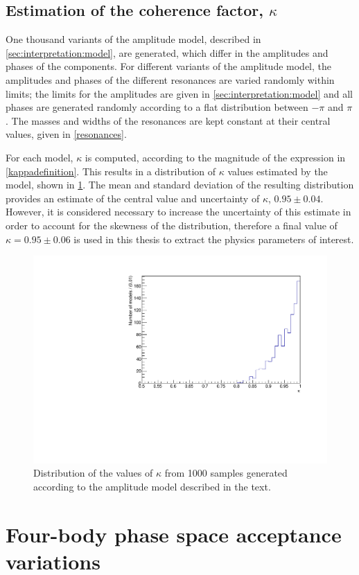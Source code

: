 \subsection{Estimation of the coherence factor, $\kappa$}
\label{sec:interpretation:kappa}

One thousand variants of the amplitude model, described in \sect\ref{sec:interpretation:model}, are generated, which differ in the amplitudes and phases of the components. For different variants of the amplitude model, the amplitudes and phases of the different resonances are varied randomly within limits; the limits for the amplitudes are given in \sect\ref{sec:interpretation:model} and all phases are generated randomly according to a flat distribution between $-\pi$ and $\pi$. The masses and widths of the resonances are kept constant at their central values, given in \tab\ref{resonances}. 

For each model, $\kappa$ is computed, according to the magnitude of the expression in \eqn\ref{kappadefinition}. This results in a distribution of $\kappa$ values estimated by the model, shown in \fig\ref{kappadistribution}. The mean and standard deviation of the resulting distribution provides an estimate of the central value and uncertainty of $\kappa$,  $0.95 \pm 0.04$. However, it is considered necessary to increase the uncertainty of this estimate in order to account for the skewness of the distribution, therefore a final value of $\kappa = 0.95 \pm 0.06$ is used in this thesis to extract the physics parameters of interest.

\begin{figure}[h]
\centering
\includegraphics[trim = 0mm 0mm 0mm 8mm, clip, width=0.5\linewidth]{figures/results/kappa.pdf}
\caption{Distribution of the values of $\kappa$ from 1000 samples generated according to the amplitude model described in the text.}
\label{kappadistribution}
\end{figure}

\section{Four-body phase space acceptance variations}
\label{sec:interpretation:inputs}

